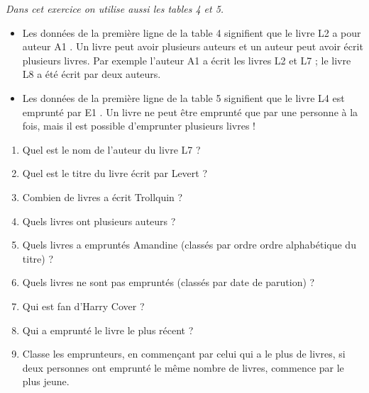 \documentclass[class=report,crop=false, 12pt]{standalone}
\begin{document}
\begin{activite}

\emph{Dans cet exercice on utilise aussi les tables 4 et 5.}


\medskip

\begin{itemize}
  \item Les données de la première ligne de la table 4 signifient que le livre \og L2 \fg{} a pour auteur \og A1 \fg{}.
  Un livre peut avoir plusieurs auteurs et un auteur peut avoir écrit plusieurs livres. Par exemple l'auteur \og{}A1\fg{} a écrit les livres \og{}L2\fg{} et \og{}L7\fg{} ; le livre \og{}L8\fg{} a été écrit par deux auteurs.
 
  \item Les données de la première ligne de la table 5 signifient que le livre \og L4 \fg{} est emprunté par \og E1 \fg{}.
  Un livre ne peut être emprunté que par une personne à la fois, mais il est possible d'emprunter plusieurs livres !
\end{itemize}


 \begin{enumerate}
  \item Quel est le nom de l'auteur du livre \og L7 \fg{} ?
  \item Quel est le titre du livre écrit par \og Levert\fg{} ?
  \item Combien de livres a écrit \og Trollquin \fg{} ?
  \item Quels livres ont plusieurs auteurs ? 
  
  \item Quels livres a empruntés Amandine (classés par ordre ordre alphabétique du titre) ? 
  \item Quels livres ne sont pas empruntés (classés par date de parution) ?
  \item Qui est fan d'Harry Cover ?
  
  \item Qui a emprunté le livre le plus récent ?
  
  \item Classe les emprunteurs, en commençant par celui qui a le plus de livres, si deux personnes ont emprunté le même nombre de livres, commence par le plus jeune.
  
\end{enumerate}

\end{activite}
\end{document}
